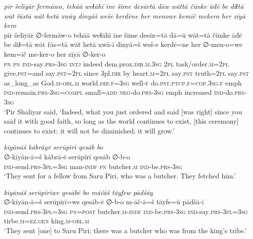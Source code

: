 \ea \label{ŽP.243}
\textit{pīr šelīyār fermāwo, tehāā weɫāhī īne šime desūrtā dāw wāttā čūnke āđē be diɫtā wāt řāstā wāt hetā xwāy dinyāš weše kerdēne her menowe kemīč mekero her zīyā kero} \\ 
\gll pīr šelīyār ∅-fermāw-o tehāā weɫāhī īne šime desūr=tā dā=ū wāt=tā čūnke āđē be diɫ=tā wāt řās=tā wāt hetā xwā-ī dinyā=š weš-e kerdē=ne her ∅-men-o=we kem=īč me-ker-o her zīyā ∅-ker-o \\ 
 \textsc{pn} \textsc{pn} \textsc{ind-}say\textsc{.prs}\textsc{-3sg} \textsc{intj} indeed dem.prox\textsc{.dir}\textsc{.m}\textsc{.3sg} \textsc{2pl} task/order\textsc{.m}=\textsc{2pl} give\textsc{.pst}=and say\textsc{.pst}=\textsc{2pl} since 3pl\textsc{.dir} by heart\textsc{.m}=\textsc{2pl} say\textsc{.pst} truth=\textsc{2pl} say\textsc{.pst} as\_long\_as God\textsc{.m}\textsc{-obl}\textsc{.m} world\textsc{.dir}\textsc{.f}\textsc{=3sg} well\textsc{-f} do\textsc{.pst}\textsc{.ptcp}\textsc{.f}\textsc{=cop}\textsc{.3sg}\textsc{.f} emph \textsc{ind-}remain\textsc{.prs}\textsc{-3sg}\textsc{=compl} small\textsc{=add} \textsc{neg-}do\textsc{.prs}\textsc{-3sg} emph increased \textsc{ind-}do\textsc{.prs}\textsc{-3sg} \\ 
\glt `Pir Shaliyar said, ‘Indeed, what you just ordered and said [was right] since you said it with good faith, so long as the world continues to exist, [this ceremony] continues to exist; it will not be diminished; it will grow.'
\z 
 
\ea \label{ŽP.250}
\textit{kīyānāš kābrāyē serūpīrī qesāb bo} \\ 
\gll ∅-kīyān-ā=š kābrā-ē serūpīrī qesāb ∅-b-o \\ 
 \textsc{ind-}send\textsc{.prs}\textsc{-3pl}\textsc{=3sg} man\textsc{-indf} \textsc{pn} butcher\textsc{.m} \textsc{ind-}be\textsc{.prs}\textsc{-3sg} \\ 
\glt `They sent for a fellow from Saru Piri, who was a butcher. They fetched him.'
\z 
 
\ea \label{ŽP.251}
\textit{kīyānāš serūpīrīwe qesābē bo māčāš tāyfew pādšāy} \\ 
\gll ∅-kīyān-ā=š serūpīrī=we qesāb-ē ∅-b-o m-āč-ā=š tāyfe=ū pādšā-ī \\ 
 \textsc{ind-}send\textsc{.prs}\textsc{-3pl}\textsc{=3sg} \textsc{pn}\textsc{=\textsc{post}} butcher\textsc{.m}\textsc{-indf} \textsc{ind-}be\textsc{.prs}\textsc{-3sg} \textsc{ind-}say\textsc{.prs}\textsc{-3pl}\textsc{=3sg} tirbe\textsc{.m}\textsc{\textsc{=ez.gen}} king\textsc{.m}\textsc{-obl}\textsc{.m} \\ 
\glt `They sent [one] to Saru Piri; there was a butcher who was from the king’s tribe.'
\z 
 
